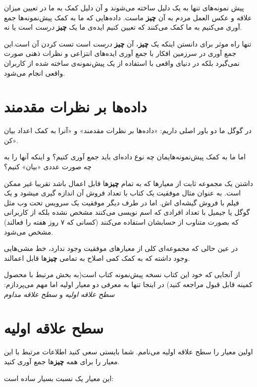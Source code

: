 پیش نمونه‌های تنها به یک دلیل ساخته می‌شوند و آن دلیل کمک به ما در تعیین
میزان علاقه و عکس العمل مردم به آن \textbf{چیز} ماست. داده‌هایی که ما به
کمک پیش‌نمونه‌ها جمع آوری می‌کنیم به ما کمک می‌کنند که تعیین کنیم ایده‌ی
ما یک \textbf{چیز} \emph{درست} است یا نه.

تنها راه موثر برای دانستن اینکه یک \textbf{چیز}، آن \textbf{چیز}
\emph{درست} است تست کردن آن است.این جمع آوری در سرزمین افکار با جمع آوری
ایده‌های انتزاعی و نظرات ذهنی صورت نمی‌گیرد بلکه در دنیای واقعی با
استفاده از یک پیش‌نمونه‌ی ساخته شده از کاربران واقعی انجام می‌شود.

\section{داده‌ها بر نظرات
مقدمند}\label{ux62fux627ux62fux647ux647ux627-ux628ux631-ux646ux638ux631ux627ux62a-ux645ux642ux62fux645ux646ux62f}

در گوگل ما دو باور اصلی داریم: «داده‌ها بر نظرات مقدمند» و «آنرا به کمک
اعداد بیان کن».

اما ما به کمک پیش‌نمونه‌هایمان چه نوع داده‌ای باید جمع آوری کنیم؟ و
اینکه آنها را به چه صورت عددی «بیان» کنیم؟

داشتن یک مجموعه ثابت از معیارها که به تمام \textbf{چیز}ها قابل اعمال
باشد تقریبا غیر ممکن است. به عنوان مثال موفقیت یک کتاب با تعداد فروش آن
اندازه گیری میشود و یک فیلم با فروش گیشه‌ای اش. اما در طرف دیگر موفقیت
یک سرویس تحت وب مثل گوگل یا جیمیل با تعداد افرادی که اسم نویسی می‌کنند
مشخص نشده بلکه از کاربرانی که بصورت متناوب از حسابشان استفاده می‌کنند
(کسانی که ۷ روز هفته را فعالند) مشخص می‌شود.

در عین حالی که مجموعه‌ای کلی از معیارهای موفقیت وجود ندارد، خط مشی‌هایی
وجود داشته که به کمک کمی اصلاح به تمامی \textbf{چیز}ها قابل اعمالند.

از آنجایی که خود این کتاب نسخه پیش‌نمونه کتاب است(به بخش مرتبط با محصول
کمینه قابل قبول مراجعه کنید) در اینجا تنها به معرفی دو معیار اولیه اما
مهم می‌پردازم: \emph{سطح علاقه اولیه} و \emph{سطح علاقه مداوم}

\section{سطح علاقه
اولیه}\label{ux633ux637ux62d-ux639ux644ux627ux642ux647-ux627ux648ux644ux6ccux647}

اولین معیار را سطح علاقه اولیه می‌نامم. شما بایستی سعی کنید اطلاعات
مرتبط با این معیار را برای همه \textbf{چیز}ها جمع آوری کنید.

این معیار یک نسبت بسیار ساده است:

